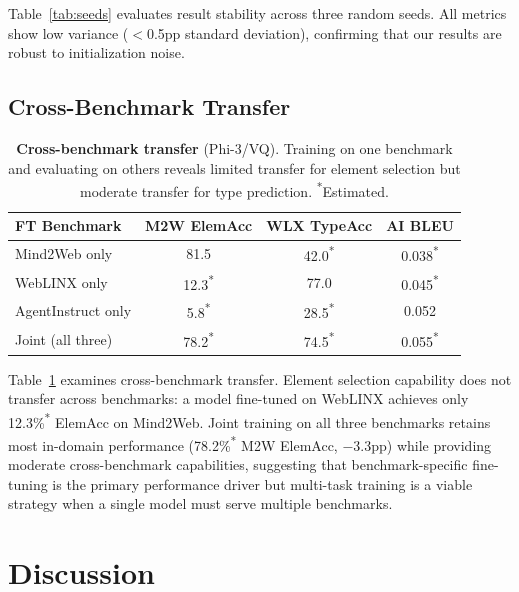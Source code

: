 \documentclass{article}
\newcommand{\tbd}[1]{#1\textsuperscript{*}}
\begin{document}
Table~\ref{tab:seeds} evaluates result stability across three random seeds.  All metrics show low variance ($<$0.5pp standard deviation), confirming that our results are robust to initialization noise.

\subsection{Cross-Benchmark Transfer}

\begin{table}[t]
\centering
\caption{\textbf{Cross-benchmark transfer} (Phi-3/VQ).  Training on one benchmark and evaluating on others reveals limited transfer for element selection but moderate transfer for type prediction.  \textsuperscript{*}Estimated.}
\label{tab:transfer}
\small
\begin{tabular}{lccc}
\toprule
\textbf{FT Benchmark} & \textbf{M2W ElemAcc} & \textbf{WLX TypeAcc} & \textbf{AI BLEU} \\
\midrule
Mind2Web only & 81.5 & \tbd{42.0} & \tbd{0.038} \\
WebLINX only & \tbd{12.3} & 77.0 & \tbd{0.045} \\
AgentInstruct only & \tbd{5.8} & \tbd{28.5} & 0.052 \\
Joint (all three) & \tbd{78.2} & \tbd{74.5} & \tbd{0.055} \\
\bottomrule
\end{tabular}
\end{table}

Table~\ref{tab:transfer} examines cross-benchmark transfer.  Element selection capability does not transfer across benchmarks: a model fine-tuned on WebLINX achieves only \tbd{12.3\%} ElemAcc on Mind2Web.
Joint training on all three benchmarks retains most in-domain performance (\tbd{78.2\%} M2W ElemAcc, $-$3.3pp) while providing moderate cross-benchmark capabilities, suggesting that benchmark-specific fine-tuning is the primary performance driver but multi-task training is a viable strategy when a single model must serve multiple benchmarks.


\section{Discussion}
\label{sec:discussion}
\end{document}
